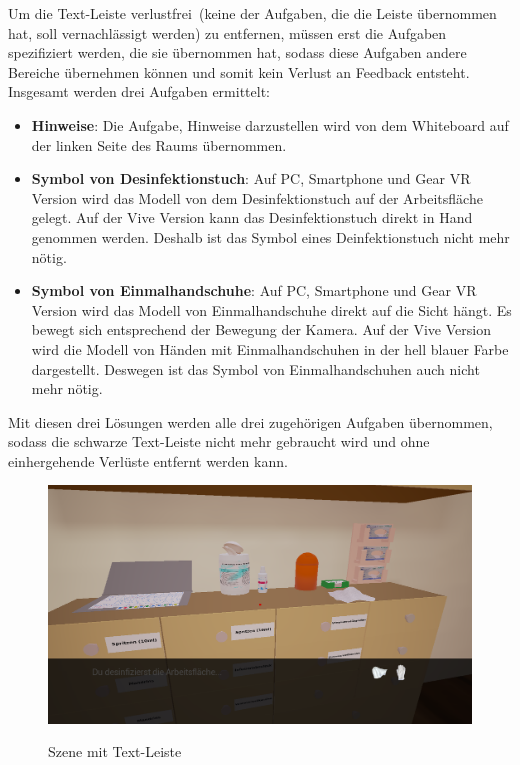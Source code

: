    Um die Text-Leiste \glqq verlustfrei\grqq\ (keine der Aufgaben, die die Leiste übernommen hat, soll vernachlässigt werden) zu entfernen, müssen erst die Aufgaben spezifiziert werden, die sie übernommen hat, sodass diese Aufgaben andere Bereiche übernehmen können und somit kein Verlust an Feedback entsteht. Insgesamt werden drei Aufgaben ermittelt:
   
   \begin{itemize}
       \item \textbf{Hinweise}: Die Aufgabe, Hinweise darzustellen wird von dem Whiteboard auf der linken Seite des Raums übernommen.
       \item \textbf{Symbol von Desinfektionstuch}: Auf PC, Smartphone und Gear VR Version wird das Modell von dem Desinfektionstuch auf der Arbeitsfläche gelegt. Auf der Vive Version kann das Desinfektionstuch direkt in Hand genommen werden. Deshalb ist das Symbol eines Deinfektionstuch nicht mehr nötig.
       \item \textbf{Symbol von Einmalhandschuhe}: Auf PC, Smartphone und Gear VR Version wird das Modell von Einmalhandschuhe direkt auf die Sicht hängt. Es bewegt sich entsprechend der Bewegung der Kamera. Auf der Vive Version wird die Modell von Händen mit Einmalhandschuhen in der hell blauer Farbe dargestellt. Deswegen ist das Symbol von Einmalhandschuhen auch nicht mehr nötig. 
   \end{itemize}
   
   Mit diesen drei Lösungen werden alle drei zugehörigen Aufgaben übernommen, sodass die schwarze Text-Leiste nicht mehr gebraucht wird und ohne einhergehende Verlüste entfernt werden kann.
   
\begin{figure}[ht]
\vspace*{1em}
\centering
\caption{Szene mit Text-Leiste}
\includegraphics[width=\textwidth]{images/Schritt_4_2.png}
\label{fig:Schritt_4_2} 
\end{figure}
   

